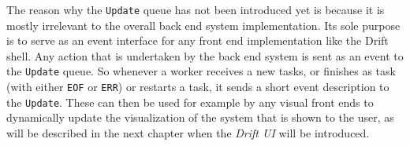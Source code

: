 The reason why the \texttt{Update} queue has not been introduced
yet is because it is mostly irrelevant to the overall back end
system implementation. Its sole purpose is to serve as an event
interface for any front end implementation like the Drift shell.
Any action that is undertaken by the back end system is sent as
an event to the \texttt{Update} queue. So whenever a worker
receives a new tasks, or finishes as task (with either \texttt{EOF}
or \texttt{ERR}) or restarts a task, it sends a short event
description to the \texttt{Update}. These can then be used
for example by any visual front ends to dynamically update the
visualization of the system that is shown to the user, as will
be described in the next chapter when the \textit{Drift UI} will
be introduced.









